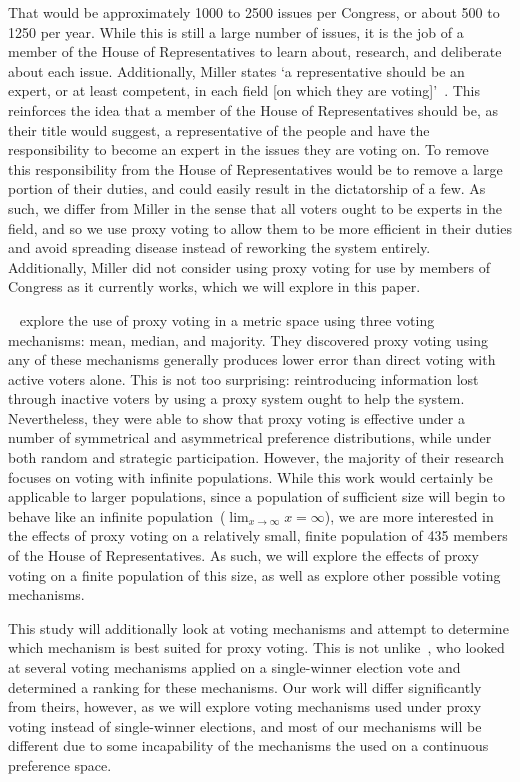 That would be approximately 1000 to 2500 issues per Congress, or about 500 to 1250 per
year.
While this is still a large number of issues, it is the job of a member of the House
of Representatives to learn about, research, and deliberate about each issue.
Additionally, Miller states `a representative should be an expert, or at least
competent, in each field [on which they are voting]'~\cite{Miller1969}.
This reinforces the idea that a member of the House of Representatives should be, as
their title would suggest, a representative of the people and have the responsibility
to become an expert in the issues they are voting on.
To remove this responsibility from the House of Representatives would be to remove
a large portion of their duties, and could easily result in the dictatorship of a few.
As such, we differ from Miller in the sense that all voters ought to be experts in
the field, and so we use proxy voting to allow them to be more efficient in their
duties and avoid spreading disease instead of reworking the system entirely.
Additionally, Miller did not consider using proxy voting for use by members of
Congress as it currently works, which we will explore in this paper.

~\cite{Cohensius2017} explore the use of proxy voting in a metric space
using three voting mechanisms: mean, median, and majority.
They discovered proxy voting using any of these mechanisms generally produces lower
error than direct voting with active voters alone.
This is not too surprising: reintroducing information lost through inactive voters by
using a proxy system ought to help the system.
Nevertheless, they were able to show that proxy voting is effective under a number of
symmetrical and asymmetrical preference distributions, while under both random and
strategic participation.
However, the majority of their research focuses on voting with infinite populations.
While this work would certainly be applicable to larger populations, since a
population of sufficient size will begin to behave like an infinite
population~($\lim_{x \rightarrow \infty} x = \infty$), we are more interested in the
effects of proxy voting on a relatively small, finite population of 435 members of the
House of Representatives.
As such, we will explore the effects of proxy voting on a finite population of this
size, as well as explore other possible voting mechanisms.

This study will additionally look at voting mechanisms and attempt to determine which
mechanism is best suited for proxy voting.
This is not unlike~\cite{Mathur2017}, who looked at several voting mechanisms applied
on a single-winner election vote and determined a ranking for these mechanisms.
Our work will differ significantly from theirs, however, as we will explore voting
mechanisms used under proxy voting instead of single-winner elections, and most of
our mechanisms will be different due to some incapability of the mechanisms the  used
on a continuous preference space.

